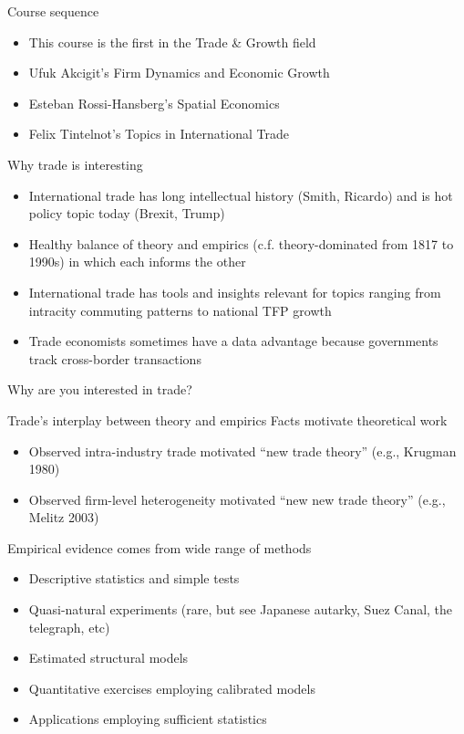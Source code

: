 \documentclass[10pt,notes=hide]{beamer}
\begin{document}
\begin{frame}{Course sequence}
\begin{itemize}
	\item This course is the first in the Trade \& Growth field
	\item Ufuk Akcigit's Firm Dynamics and Economic Growth
	\item Esteban Rossi-Hansberg's Spatial Economics
	\item Felix Tintelnot's Topics in International Trade
\end{itemize}
\end{frame}
\begin{frame}{Why trade is interesting}
\begin{itemize}
	\item International trade has long intellectual history (Smith, Ricardo) and is hot policy topic today (Brexit, Trump)
	\item Healthy balance of theory and empirics (c.f. theory-dominated from 1817 to 1990s) in which each informs the other
	\item International trade has tools and insights relevant for topics ranging from intracity commuting patterns to national TFP growth
	\item Trade economists sometimes have a data advantage because governments track cross-border transactions
\end{itemize}
\vspace{0.5cm}
Why are you interested in trade?
\end{frame}
\begin{frame}{Trade's interplay between theory and empirics}
Facts motivate theoretical work
\begin{itemize}
	\item Observed intra-industry trade motivated ``new trade theory'' (e.g., Krugman 1980)
	\item Observed firm-level heterogeneity motivated ``new new trade theory'' (e.g., Melitz 2003)
\end{itemize}
Empirical evidence comes from wide range of methods
\begin{itemize}
	\item Descriptive statistics and simple tests
	\item Quasi-natural experiments (rare, but see Japanese autarky, Suez Canal, the telegraph, etc)
	\item Estimated structural models
	\item Quantitative exercises employing calibrated models
	\item Applications employing sufficient statistics
\end{itemize}
\end{frame}
\end{document}

